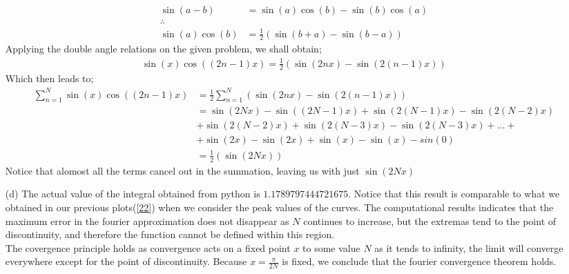 \documentclass[12pt,a4paper]{article}
\begin{document}
\begin{itemize}
\begin{align*}
	\sin(a-b)&=\sin(a)\cos(b)-\sin(b)\cos(a)\\
	\therefore&\\
	\sin(a)\cos(b)&=\frac{1}{2}\left(\sin(b+a)-\sin(b-a)\right)
	\end{align*}
	Applying the double angle relations on the given problem, we shall obtain;
	\begin{align*}
	\sin(x)\cos((2n-1)x)=\frac{1}{2}\left(\sin(2nx)-\sin(2(n-1)x)\right)
	\end{align*}
	Which then leads to;
	\begin{align*}
	\sum_{n=1}^{N}\sin(x)\cos((2n-1)x)&=\frac{1}{2}\sum_{n=1}^{N}\left(\sin(2nx)-\sin(2(n-1)x)\right)\\
	&=\sin(2Nx)-\sin((2N-1)x)+\sin(2(N-1)x)-\sin(2(N-2)x)\\
	&+\sin(2(N-2)x)+\sin(2(N-3)x)-\sin(2(N-3)x)+...+\\
	&+\sin(2x)-\sin(2x)+\sin(x)-\sin(x)-sin(0)\\
	&=\frac{1}{2}\left(\sin(2Nx)\right) 
	\end{align*}
	Notice that alomost all the terms cancel out in the summation, leaving us with just $\sin(2Nx)$
	
	\item [(d)]
	The actual value of the integral obtained from python is $1.1789797444721675$. Notice that this result is comparable to what we obtained in our previous plots(\ref{22}) when we consider the peak values of the curves. The computational results indicates that the maximum error in the fourier approximation does not disappear as $N$ continues to increase, but the extremas tend to the point of discontinuity, and therefore the function cannot be defined within this region.\\
	\newline
	The covergence principle holds as convergence acts on a fixed point $x$ to some value $N$ as it tends to infinity, the limit will converge everywhere except for the point of discontinuity. Because $x=\frac{\pi}{2N}$ is fixed, we conclude that the fourier convergence theorem holds.
	
\end{itemize}
	
\end{document}
